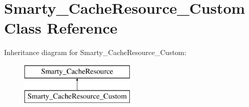 \hypertarget{class_smarty___cache_resource___custom}{}\section{Smarty\+\_\+\+Cache\+Resource\+\_\+\+Custom Class Reference}
\label{class_smarty___cache_resource___custom}
Inheritance diagram for Smarty\+\_\+\+Cache\+Resource\+\_\+\+Custom\+:\begin{figure}[H]
\begin{center}
\leavevmode
\includegraphics[height=2.000000cm]{class_smarty___cache_resource___custom}
\end{center}
\end{figure}
